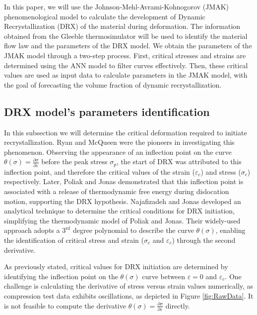 \documentclass[metals,article,submit,pdftex,moreauthors]{Definitions/mdpi}
\begin{document}
In this paper, we will use the Johnson-Mehl-Avrami-Kohnogorov (JMAK) phenomenological model \cite{Avrami-1939} to calculate the development of Dynamic Recrystallization (DRX) of the material during deformation.
The information obtained from the Gleeble thermosimulator will be used to identify the material flow law and the parameters of the DRX model.
We obtain the parameters of the JMAK model through a two-step process.
First, critical stresses and strains are determined using the ANN model to filter curves effectively.
Then, these critical values are used as input data to calculate parameters in the JMAK model, with the goal of forecasting the volume fraction of dynamic recrystallization.

\subsection{DRX model's parameters identification\label{subsec:DRXParameters}}

In this subsection we will determine the critical deformation required to initiate recrystallization.
Ryan and McQueen \cite{Ryan-1989, Ryan-1990, Ryan-1990-2} were the pioneers in investigating this phenomenon.
Observing the appearance of an inflection point on the curve $\theta(\sigma)=\frac{\partial \sigma}{\partial \varepsilon}$ before the peak stress $\sigma_p$, the start of DRX was attributed to this inflection point, and therefore the critical values of the strain ($\varepsilon_c$) and stress ($\sigma_c$) respectively.
Later, Poliak and Jonas \cite{Poliak-1996, Poliak-2003, Poliak-2003-2, Jonas-2003} demonstrated that this inflection point is associated with a release of thermodynamic free energy during dislocation motion, supporting the DRX hypothesis.
Najafizadeh and Jonas \cite{Najafizadeh-2006} developed an analytical technique to determine the critical conditions for DRX initiation, simplifying the thermodynamic model of Poliak and Jonas.
Their widely-used approach adopts a $3^\text{rd}$ degree polynomial to describe the curve $\theta(\sigma)$, enabling the identification of critical stress and strain ($\sigma_c$ and $\varepsilon_c$) through the second derivative.

As previously stated, critical values for DRX initiation are determined by identifying the inflection point on the $\theta(\sigma)$ curve between $\varepsilon=0$ and $\varepsilon_c$.
One challenge is calculating the derivative of stress versus strain values numerically, as compression test data exhibits oscillations, as depicted in Figure \ref{fig:RawData}.
It is not feasible to compute the derivative $\theta(\sigma)=\frac{\partial \sigma}{\partial \varepsilon}$ directly.
\end{document}
